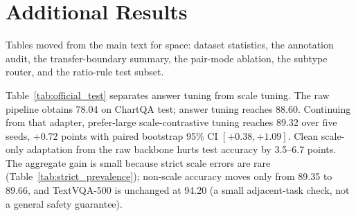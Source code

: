 \begin{table}[h]
\centering
\small
\resizebox{\textwidth}{!}{}
\caption{Examples from the negative/uncertain audit queue. These candidates contain a plausible scale relation but are not included as positive diagnostics without stronger evidence that the prediction and gold answer refer to the same chart quantity.}
\label{tab:negative_audit_examples}
\end{table}

\section{Additional Results}
\label{sec:appendix_tables}

Tables moved from the main text for space: dataset statistics, the annotation audit, the transfer-boundary summary, the pair-mode ablation, the subtype router, and the ratio-rule test subset.

\begin{table}[h]
\centering
\small
\resizebox{\linewidth}{!}{}
\caption{ScaleQA-Natural construction statistics. It is a mined diagnostic set; official ChartQA validation/test remain the task evaluations.}
\label{tab:scaleqa_stats}
\end{table}

\begin{table}[h]
\centering
\small
\resizebox{\linewidth}{!}{}
\caption{ScaleQA-Natural audit stages. Cohen's $\kappa$ compares the deterministic metadata audit with first-pass labels; the second human reviewer audited final inclusions only.}
\label{tab:annotation_audit}
\end{table}

\begin{table}[h]
\centering
\small
\resizebox{\linewidth}{!}{}
\caption{Held-out ChartQA test attribution for Qwen2.5-VL-7B. The scale update is measured on top of the answer-tuned adapter; clean direct scale-only tuning is a safety control. ``Large-positive'' denotes the prefer-large adapter.}
\label{tab:official_test}
\end{table}

Table~\ref{tab:official_test} separates answer tuning from scale tuning. The raw pipeline obtains 78.04 on ChartQA test; answer tuning reaches 88.60. Continuing from that adapter, prefer-large scale-contrastive tuning reaches 89.32 over five seeds, +0.72 points with paired bootstrap 95\% CI $[+0.38,+1.09]$. Clean scale-only adaptation from the raw backbone hurts test accuracy by 3.5--6.7 points. The aggregate gain is small because strict scale errors are rare (Table~\ref{tab:strict_prevalence}); non-scale accuracy moves only from 89.35 to 89.66, and TextVQA-500 is unchanged at 94.20 (a small adjacent-task check, not a general safety guarantee).

